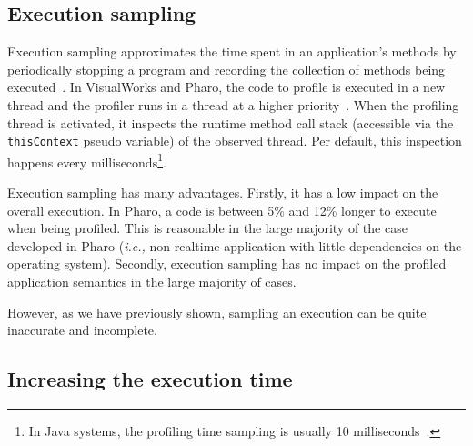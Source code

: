 \documentclass{sig-alternate}
\newcommand{\ct}{\lstinline[backgroundcolor=\color{white},basicstyle=\footnotesize\ttfamily]}
\newcommand{\ie}{\emph{i.e.,}\xspace}
\begin{document}
\subsection{Execution sampling}
Execution sampling approximates the time spent in an application's methods by periodically stopping a program and recording the collection of methods being executed~\cite{Whal00a}. In VisualWorks and Pharo, the code to profile is executed in a new thread and the profiler runs in a thread at a higher priority~\cite{Berg11d}. 
When the profiling thread is activated, it inspects the runtime method call stack (accessible via the \ct{thisContext} pseudo variable) of the observed thread. Per default, this inspection happens every milliseconds\footnote{In Java systems, the profiling time sampling is usually 10 milliseconds~\cite{Mytk10a}.}. 

Execution sampling has many advantages. Firstly, it has a low impact on the overall execution. In Pharo, a code is between 5\% and 12\% longer to execute when being profiled. This is reasonable in the large majority of the case developed in Pharo (\ie non-realtime application with little dependencies on the operating system). 
Secondly, execution sampling has no impact on the profiled application semantics in the large majority of cases. %


However, as we have previously shown, sampling an execution can be quite inaccurate and incomplete. 

\subsection{Increasing the execution time}

\end{document}
